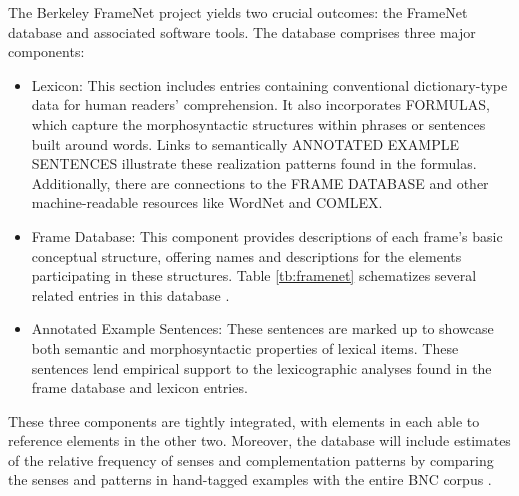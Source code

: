 The Berkeley FrameNet project yields two crucial outcomes: the FrameNet database and associated software tools. The database comprises three major components:
\begin{itemize}
\item Lexicon: This section includes entries containing conventional dictionary-type data for human readers' comprehension. It also incorporates FORMULAS, which capture the morphosyntactic structures within phrases or sentences built around words. Links to semantically ANNOTATED EXAMPLE SENTENCES illustrate these realization patterns found in the formulas. Additionally, there are connections to the FRAME DATABASE and other machine-readable resources like WordNet and COMLEX.
\item Frame Database: This component provides descriptions of each frame's basic conceptual structure, offering names and descriptions for the elements participating in these structures. Table \ref{tb:framenet} schematizes several related entries in this database \cite{baker1998berkeley}.
\item Annotated Example Sentences: These sentences are marked up to showcase both semantic and morphosyntactic properties of lexical items. These sentences lend empirical support to the lexicographic analyses found in the frame database and lexicon entries.
\end{itemize}
These three components are tightly integrated, with elements in each able to reference elements in the other two. Moreover, the database will include estimates of the relative frequency of senses and complementation patterns by comparing the senses and patterns in hand-tagged examples with the entire BNC corpus \cite{baker1998berkeley}.
